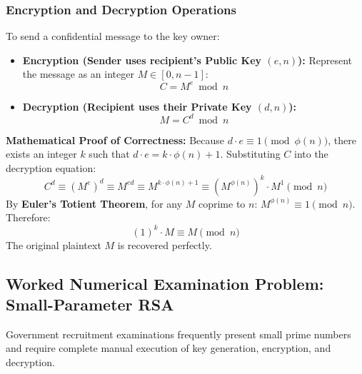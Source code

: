 \subsubsection{Encryption and Decryption Operations}

To send a confidential message to the key owner:
\begin{itemize}
\item \textbf{Encryption (Sender uses recipient's Public Key $(e, n)$):}
Represent the message as an integer $M \in [0, n - 1]$:
\[ C = M^e \bmod n \]
\item \textbf{Decryption (Recipient uses their Private Key $(d, n)$):}
\[ M = C^d \bmod n \]
\end{itemize}

\textbf{Mathematical Proof of Correctness:}
Because $d \cdot e \equiv 1 \pmod{\phi(n)}$, there exists an integer $k$ such that $d \cdot e = k \cdot \phi(n) + 1$.
Substituting $C$ into the decryption equation:
\[ C^d \equiv (M^e)^d \equiv M^{ed} \equiv M^{k \cdot \phi(n) + 1} \equiv (M^{\phi(n)})^k \cdot M^1 \pmod n \]
By \textbf{Euler's Totient Theorem}, for any $M$ coprime to $n$: $M^{\phi(n)} \equiv 1 \pmod n$. Therefore:
\[ (1)^k \cdot M \equiv M \pmod n \]
The original plaintext $M$ is recovered perfectly.

\subsection{Worked Numerical Examination Problem: Small-Parameter RSA}

Government recruitment examinations frequently present small prime numbers and require complete manual execution of key generation, encryption, and decryption.

